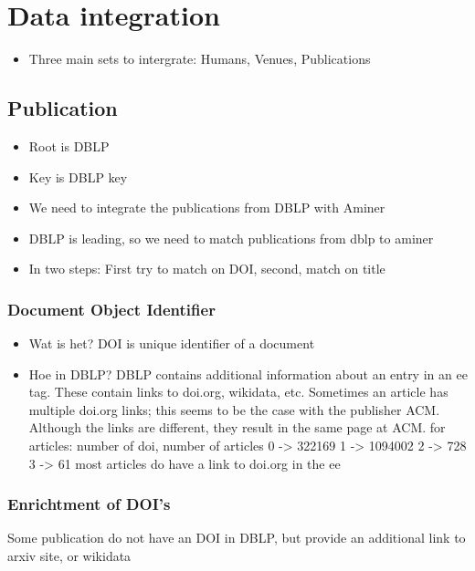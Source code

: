 \documentclass{ou-report}
\newcommand{\outline}[1]{{\color{blue} #1}}
\begin{document}
\chapter{Data integration}
\outline{
    \begin{itemize}
        \item Three main sets to intergrate: Humans, Venues, Publications
    \end{itemize}
    \section{Publication}
    \begin{itemize}
        \item Root is DBLP
        \item Key is DBLP key
        \item We need to integrate the publications from DBLP with Aminer
        \item DBLP is leading, so we need to match publications from dblp to aminer
        \item In two steps: First try to match on DOI, second, match on title
    \end{itemize}
    \subsection{Document Object Identifier}
    \begin{itemize}
        \item Wat is het? DOI is unique identifier of a document
        \item Hoe in DBLP?
            DBLP contains additional information about an entry in an ee tag.
            These contain links to doi.org, wikidata, etc.
            Sometimes an article has multiple doi.org links; this seems to be the case with the publisher ACM.
            Although the links are different, they result in the same page at ACM.
            for articles:
            number of doi, number of articles
            0 -> 322169
            1 -> 1094002
            2 -> 728
            3 -> 61
            most articles do have a link to doi.org in the ee
    \end{itemize} 
    \subsection{Enrichtment of DOI's}
    Some publication do not have an DOI in DBLP, but provide an additional link to arxiv site, or wikidata
}
\end{document}
